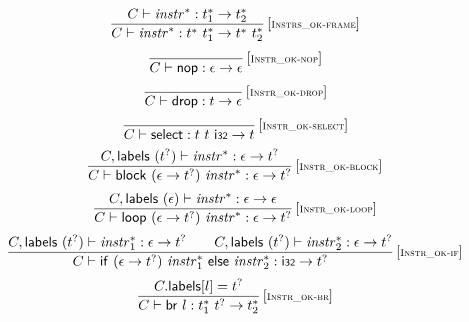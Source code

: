 \documentclass{article}
\begin{document}
$$
\begin{array}{@{}c@{}}\displaystyle
\frac{
C \vdash {{\mathit{instr}}^\ast} : {t_1^\ast} \rightarrow {t_2^\ast}
}{
C \vdash {{\mathit{instr}}^\ast} : {t^\ast}~{t_1^\ast} \rightarrow {t^\ast}~{t_2^\ast}
} \, {[\textsc{\scriptsize Instrs\_ok{-}frame}]}
\qquad
\end{array}
$$
$$
\begin{array}{@{}c@{}}\displaystyle
\frac{
}{
C \vdash \mathsf{nop} : \epsilon \rightarrow \epsilon
} \, {[\textsc{\scriptsize Instr\_ok{-}nop}]}
\qquad
\end{array}
$$
$$
\begin{array}{@{}c@{}}\displaystyle
\frac{
}{
C \vdash \mathsf{drop} : t \rightarrow \epsilon
} \, {[\textsc{\scriptsize Instr\_ok{-}drop}]}
\qquad
\end{array}
$$
$$
\begin{array}{@{}c@{}}\displaystyle
\frac{
}{
C \vdash \mathsf{select} : t~t~\mathsf{i{\scriptstyle 32}} \rightarrow t
} \, {[\textsc{\scriptsize Instr\_ok{-}select}]}
\qquad
\end{array}
$$
$$
\begin{array}{@{}c@{}}\displaystyle
\frac{
C, \mathsf{labels}~({t^?}) \vdash {{\mathit{instr}}^\ast} : \epsilon \rightarrow {t^?}
}{
C \vdash \mathsf{block}~(\epsilon \rightarrow {t^?})~{{\mathit{instr}}^\ast} : \epsilon \rightarrow {t^?}
} \, {[\textsc{\scriptsize Instr\_ok{-}block}]}
\qquad
\end{array}
$$
$$
\begin{array}{@{}c@{}}\displaystyle
\frac{
C, \mathsf{labels}~(\epsilon) \vdash {{\mathit{instr}}^\ast} : \epsilon \rightarrow \epsilon
}{
C \vdash \mathsf{loop}~(\epsilon \rightarrow {t^?})~{{\mathit{instr}}^\ast} : \epsilon \rightarrow {t^?}
} \, {[\textsc{\scriptsize Instr\_ok{-}loop}]}
\qquad
\end{array}
$$
$$
\begin{array}{@{}c@{}}\displaystyle
\frac{
C, \mathsf{labels}~({t^?}) \vdash {{\mathit{instr}}_1^\ast} : \epsilon \rightarrow {t^?}
 \qquad
C, \mathsf{labels}~({t^?}) \vdash {{\mathit{instr}}_2^\ast} : \epsilon \rightarrow {t^?}
}{
C \vdash \mathsf{if}~(\epsilon \rightarrow {t^?})~{{\mathit{instr}}_1^\ast}~\mathsf{else}~{{\mathit{instr}}_2^\ast} : \mathsf{i{\scriptstyle 32}} \rightarrow {t^?}
} \, {[\textsc{\scriptsize Instr\_ok{-}if}]}
\qquad
\end{array}
$$
$$
\begin{array}{@{}c@{}}\displaystyle
\frac{
C{.}\mathsf{labels}{}[l] = {t^?}
}{
C \vdash \mathsf{br}~l : {t_1^\ast}~{t^?} \rightarrow {t_2^\ast}
} \, {[\textsc{\scriptsize Instr\_ok{-}br}]}
\qquad
\end{array}
$$
\end{document}
